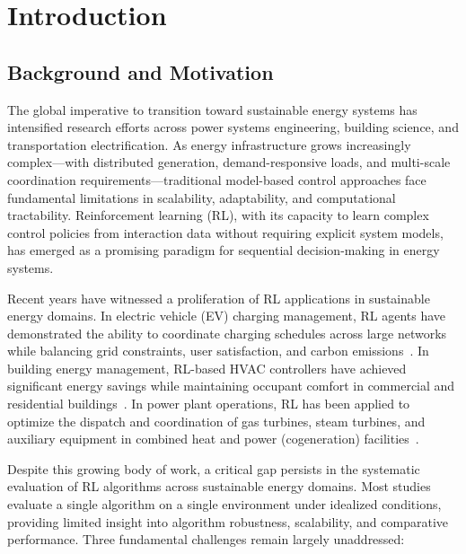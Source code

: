 \chapter{Introduction}
\label{ch:introduction}

\section{Background and Motivation}
\label{sec:background}

The global imperative to transition toward sustainable energy systems has intensified research efforts across power systems engineering, building science, and transportation electrification. As energy infrastructure grows increasingly complex---with distributed generation, demand-responsive loads, and multi-scale coordination requirements---traditional model-based control approaches face fundamental limitations in scalability, adaptability, and computational tractability. Reinforcement learning (RL), with its capacity to learn complex control policies from interaction data without requiring explicit system models, has emerged as a promising paradigm for sequential decision-making in energy systems.

Recent years have witnessed a proliferation of RL applications in sustainable energy domains. In electric vehicle (EV) charging management, RL agents have demonstrated the ability to coordinate charging schedules across large networks while balancing grid constraints, user satisfaction, and carbon emissions~\citep{lee2019acndata, qiu2023marl_ev}. In building energy management, RL-based HVAC controllers have achieved significant energy savings while maintaining occupant comfort in commercial and residential buildings~\citep{wei2017deep_hvac, zhang2019model_hvac}. In power plant operations, RL has been applied to optimize the dispatch and coordination of gas turbines, steam turbines, and auxiliary equipment in combined heat and power (cogeneration) facilities~\citep{vu2021gas_turbine}.

Despite this growing body of work, a critical gap persists in the systematic evaluation of RL algorithms across sustainable energy domains. Most studies evaluate a single algorithm on a single environment under idealized conditions, providing limited insight into algorithm robustness, scalability, and comparative performance. Three fundamental challenges remain largely unaddressed:


